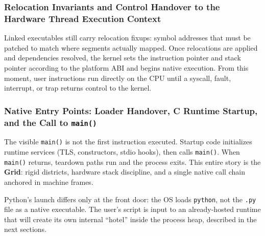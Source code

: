 \subsubsection{Relocation Invariants and Control Handover to the Hardware Thread Execution Context}

Linked executables still carry relocation fixups: symbol addresses that must be patched to match where segments actually mapped. Once relocations are applied and dependencies resolved, the kernel sets the instruction pointer and stack pointer according to the platform ABI and begins native execution. From this moment, user instructions run directly on the CPU until a syscall, fault, interrupt, or trap returns control to the kernel.

\subsubsection{Native Entry Points: Loader Handover, C Runtime Startup, and the Call to \texttt{main()}}

The visible \texttt{main()} is not the first instruction executed. Startup code initializes runtime services (TLS, constructors, stdio hooks), then calls \texttt{main()}. When \texttt{main()} returns, teardown paths run and the process exits. This entire story is the \textbf{Grid}: rigid districts, hardware stack discipline, and a single native call chain anchored in machine frames.

Python's launch differs only at the front door: the OS loads \texttt{python}, not the \texttt{.py} file as a native executable. The user's script is input to an already-hosted runtime that will create its own internal ``hotel'' inside the process heap, described in the next sections.
